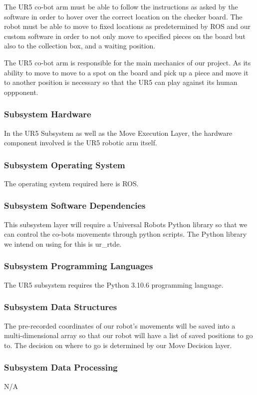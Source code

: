 The UR5 co-bot arm must be able to follow the instructions as asked by the software in order to hover over the correct location on the checker board. The robot must be able to move to fixed locations as predetermined by ROS and our custom software in order to not only move to specified pieces on the board but also to the collection box, and a waiting position.

The UR5 co-bot arm is responsible for the main mechanics of our project. As its ability to move to move to a spot on the board and pick up a piece and move it to another position is necessary so that the UR5 can play against its human oppponent.


\subsubsection{Subsystem Hardware}
In the UR5 Subsystem as well as the Move Execution Layer, the hardware component involved is the UR5 robotic arm itself.

\subsubsection{Subsystem Operating System}
The operating system required here is ROS.

\subsubsection{Subsystem Software Dependencies}
This subsystem layer will require a Universal Robots Python library so that we can control the co-bots movements through python scripts. The Python library we intend on using for this is ur\_rtde.

\subsubsection{Subsystem Programming Languages}
The UR5 subsystem requires the Python 3.10.6 programming language.

\subsubsection{Subsystem Data Structures}
The pre-recorded coordinates of our robot's movements will be saved into a multi-dimensional array so that our robot will have a list of saved positions to go to. The decision on where to go is determined by our Move Decision layer.

\subsubsection{Subsystem Data Processing}
N/A

